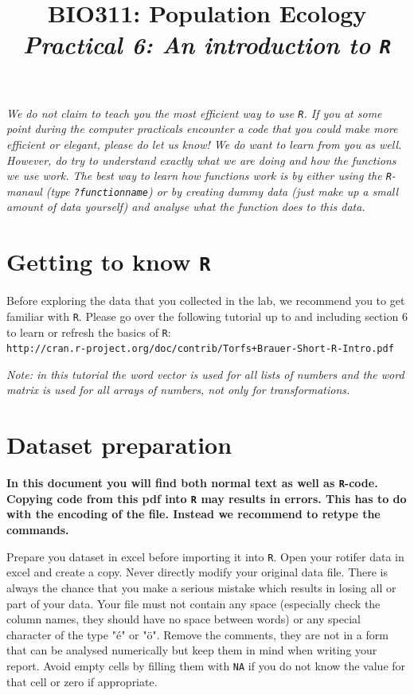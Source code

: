 \documentclass[12pt,a4paper]{article}\usepackage[]{graphicx}\usepackage[]{color}
\title{BIO311: Population Ecology\\ \textit{Practical 6: An introduction to \texttt{R}}}
\begin{document}



\maketitle
\tableofcontents
\vspace{1cm}
\begin{mdframed}
\textit{We do not claim to teach you the most efficient way to use \texttt{R}. If you at some point during the computer practicals encounter a code that you could make more efficient or elegant, please do let us know! We do want to learn from you as well.\\[1.5ex] However, do try to understand exactly what we are doing and how the functions we use work. The best way to learn how functions work is by either using the \texttt{R}-manaul (type \texttt{?functionname}) or by creating dummy data (just make up a small amount of data yourself) and analyse what the function does to this data.}
\end{mdframed}
\newpage
\section{Getting to know \texttt{R}}
Before exploring the data that you collected in the lab, we recommend you to get familiar with \texttt{R}. Please go over the following tutorial up to and including section 6 to learn or refresh the basics of \texttt{R}:\\

\texttt{http://cran.r-project.org/doc/contrib/Torfs+Brauer-Short-R-Intro.pdf}
\vspace{1.5ex}

\textit{Note: in this tutorial the word vector is used for all lists of numbers and the word matrix is used for all arrays of numbers, not only for transformations.}

\section{Dataset preparation}
\begin{mdframed}[backgroundcolor=red!40]
\textbf{In this document you will find both normal text as well as \texttt{R}-code. Copying code from this pdf into \texttt{R} may results in errors. This has to do with the encoding of the file. Instead we recommend to retype the commands.}
\end{mdframed}
Prepare you dataset in excel before importing it into \texttt{R}. Open your rotifer data in excel and create a copy. Never directly modify your original data file. There is always the chance that you make a serious mistake which results in losing all or part of your data. Your file must not contain any space (especially check the column names, they should have no space between words) or any special character of the type "\'e" or "\"o". Remove the comments, they are not in a form that can be analysed numerically but keep them in mind when writing your report. Avoid empty cells by filling them with \texttt{NA} if you do not know the value for that cell or zero if appropriate. 
\end{document}
